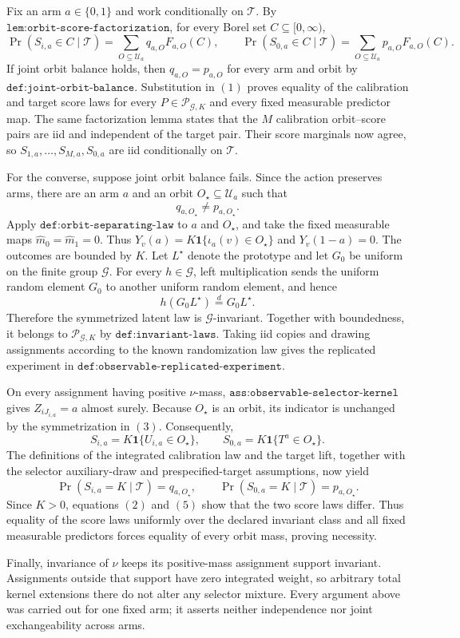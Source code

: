 Fix an arm \(a\in\{0,1\}\) and work conditionally on \(\mathcal T\). By \(\texttt{lem:orbit-score-factorization}\), for every Borel set \(C\subseteq[0,\infty)\),
\[
\Pr(S_{i,a}\in C\mid\mathcal T)=\sum_{O\subseteq\mathcal U_a}q_{a,O}F_{a,O}(C),\qquad\Pr(S_{0,a}\in C\mid\mathcal T)=\sum_{O\subseteq\mathcal U_a}p_{a,O}F_{a,O}(C).\tag{1}
\]
If joint orbit balance holds, then \(q_{a,O}=p_{a,O}\) for every arm and orbit by \(\texttt{def:joint-orbit-balance}\). Substitution in \( (1) \) proves equality of the calibration and target score laws for every \(P\in\mathcal P_{\mathcal G,K}\) and every fixed measurable predictor map. The same factorization lemma states that the \(M\) calibration orbit--score pairs are iid and independent of the target pair. Their score marginals now agree, so \(S_{1,a},\ldots,S_{M,a},S_{0,a}\) are iid conditionally on \(\mathcal T\).

For the converse, suppose joint orbit balance fails. Since the action preserves arms, there are an arm \(a\) and an orbit \(O_\star\subseteq\mathcal U_a\) such that
\[
q_{a,O_\star}\ne p_{a,O_\star}.\tag{2}
\]
Apply \(\texttt{def:orbit-separating-law}\) to \(a\) and \(O_\star\), and take the fixed measurable maps \(\widehat m_0=\widehat m_1=0\). Thus \(Y_v(a)=K\mathbf 1\{\iota_a(v)\in O_\star\}\) and \(Y_v(1-a)=0\). The outcomes are bounded by \(K\). Let \(L^\star\) denote the prototype and let \(G_0\) be uniform on the finite group \(\mathcal G\). For every \(h\in\mathcal G\), left multiplication sends the uniform random element \(G_0\) to another uniform random element, and hence
\[
h(G_0L^\star)\stackrel{d}{=}G_0L^\star.\tag{3}
\]
Therefore the symmetrized latent law is \(\mathcal G\)-invariant. Together with boundedness, it belongs to \(\mathcal P_{\mathcal G,K}\) by \(\texttt{def:invariant-laws}\). Taking iid copies and drawing assignments according to the known randomization law gives the replicated experiment in \(\texttt{def:observable-replicated-experiment}\).

On every assignment having positive \(\nu\)-mass, \(\texttt{ass:observable-selector-kernel}\) gives \(Z_{iJ_{i,a}}=a\) almost surely. Because \(O_\star\) is an orbit, its indicator is unchanged by the symmetrization in \( (3) \). Consequently,
\[
S_{i,a}=K\mathbf 1\{U_{i,a}\in O_\star\},\qquad S_{0,a}=K\mathbf 1\{T^a\in O_\star\}.\tag{4}
\]
The definitions of the integrated calibration law and the target lift, together with the selector auxiliary-draw and prespecified-target assumptions, now yield
\[
\Pr(S_{i,a}=K\mid\mathcal T)=q_{a,O_\star},\qquad\Pr(S_{0,a}=K\mid\mathcal T)=p_{a,O_\star}.\tag{5}
\]
Since \(K>0\), equations \( (2) \) and \( (5) \) show that the two score laws differ. Thus equality of the score laws uniformly over the declared invariant class and all fixed measurable predictors forces equality of every orbit mass, proving necessity.

Finally, invariance of \(\nu\) keeps its positive-mass assignment support invariant. Assignments outside that support have zero integrated weight, so arbitrary total kernel extensions there do not alter any selector mixture. Every argument above was carried out for one fixed arm; it asserts neither independence nor joint exchangeability across arms.